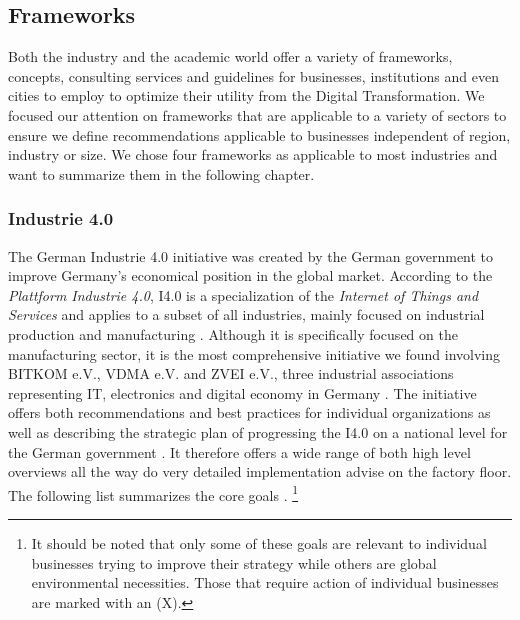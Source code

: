 \subsection{Frameworks}
\label{subsec:frameworks}



Both the industry and the academic world offer a variety of frameworks, concepts, consulting services and guidelines for businesses, institutions and even cities to employ to optimize their utility from the Digital Transformation.
We focused our attention on frameworks that are applicable to a variety of sectors to ensure we define recommendations applicable to businesses independent of region, industry or size. 
We chose four frameworks as applicable to most industries and want to summarize them in the following chapter.

\subsubsection{Industrie 4.0}
The German Industrie 4.0 initiative was created by the German government to improve Germany's economical position in the global market. According to the \emph{Plattform Industrie 4.0}, I4.0 is a specialization of the \emph{Internet of Things and Services} and applies to a subset of all industries, mainly focused on industrial production and manufacturing
\cite[p.41]{umsetzungsstrategie:2015}. Although it is specifically focused on the manufacturing sector, it is the most comprehensive initiative we found involving BITKOM e.V., VDMA e.V. and ZVEI e.V., three industrial associations representing IT, electronics and digital economy in Germany \cite{zveimembers:2016, vdmamembers:2016, bitkommembers:2016}. The initiative offers both recommendations and best practices for individual organizations \cite[p.40ff.]{umsetzungsstrategie:2015} as well as describing the strategic plan of progressing the \ac{I4.0} on a national level for the German government \cite[p.15ff.]{umsetzungsstrategie:2015}. It therefore offers a wide range of both high level overviews all the way do very detailed implementation advise on the factory floor.
 The following list summarizes the core goals \cite[p.8]{umsetzungsstrategie:2015}. \footnote{It should be noted that only some of these goals are relevant to individual businesses trying to improve their strategy while others are global environmental necessities. Those that require action of individual businesses are marked with an (X).}


